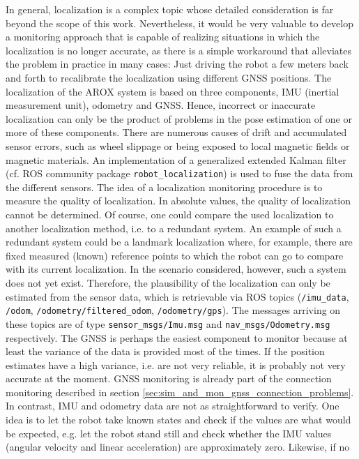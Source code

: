 \documentclass[english, master, utf8]{base/thesis_KBS}
\newcommand{\code}[1]{\colorbox{light-gray}{\texttt{#1}}}
\begin{document}
In general, localization is a complex topic whose detailed consideration is far beyond the scope of this work.
Nevertheless, it would be very valuable to develop a monitoring approach that is capable of realizing situations in which the localization is no
longer accurate, as there is a simple workaround that alleviates the problem in practice in many cases: Just driving the robot
a few meters back and forth to recalibrate the localization using different GNSS positions. The localization of the AROX system
is based on three components, IMU (inertial measurement unit), odometry and GNSS. Hence, incorrect or inaccurate localization can only be the product of problems in the pose
estimation of one or more of these components. There are numerous causes of drift and accumulated sensor errors, such as wheel slippage or being exposed to local magnetic fields
or magnetic materials. \cite{Bechar:2016} An implementation of a generalized
extended Kalman filter (cf. ROS community package \code{robot\_localization}) is used to fuse the data from the different
sensors. The idea of a localization monitoring procedure is to measure the quality of localization. In absolute values, the
quality of localization cannot be determined. Of course, one could compare the used localization to another localization method,
i.e. to a redundant system. An example of such a redundant system could be a landmark localization where, for example, there are
fixed measured (known) reference points to which the robot can go to compare with its current localization. In the scenario
considered, however, such a system does not yet exist. Therefore, the plausibility of the localization can only be estimated
from the sensor data, which is retrievable via ROS topics (\code{/imu\_data}, \code{/odom}, \code{/odometry/filtered\_odom},
\code{/odometry/gps}). The messages arriving on these topics are of type \code{sensor\_msgs/Imu.msg} and
\code{nav\_msgs/Odometry.msg} respectively. The GNSS is perhaps the easiest component to monitor because at least the variance of the data is provided most of the times.
If the position estimates have a high variance, i.e. are not very reliable, it is probably not very accurate at the moment. GNSS monitoring is already part
of the connection monitoring described in section \ref{sec:sim_and_mon_gnss_connection_problems}. In contrast, IMU and odometry data are not as straightforward to
verify. One idea is to let the robot take known states and check if the values are what would be expected, e.g. let the robot
stand still and check whether the IMU values (angular velocity and linear acceleration) are approximately zero. Likewise, if no
\end{document}
